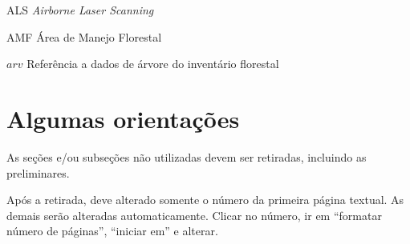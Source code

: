 \documentclass[
	12pt,				%
	openright,			%
	twoside,			%
	a4paper,			%
	chapter=TITLE,		%
	sumario=abnt-6027-2012,
	english,			%
	brazil				%
	]{UFVJM-abntex2}
\begin{document}
\listoftables*
\cleardoublepage

\begin{siglas}
\label{Siglas}
\item[ALS] \textit{Airborne Laser Scanning}
\item[AMF] Área de Manejo Florestal 
\item[$arv$] Referência a dados de árvore do inventário florestal

\end{siglas}



\tableofcontents
\cleardoublepage



\textual

\section{Algumas orientações}


As seções e/ou subseções não utilizadas devem ser retiradas, incluindo as preliminares.

Após a retirada, deve alterado somente o número da primeira página textual. As demais serão alteradas automaticamente. Clicar no número, ir em “formatar número de páginas”, “iniciar em” e alterar.
\end{document}

